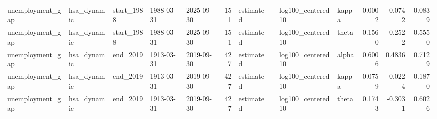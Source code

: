 \begin{tabular}{lllllrllllrrr}
unemployment\_gap & hsa\_dynamic & start\_1988 & 1988-03-31 & 2025-09-30 & 151 & estimated &  & log100\_centered10 & kappa & 0.0002 & -0.0742 & 0.0839 \\
unemployment\_gap & hsa\_dynamic & start\_1988 & 1988-03-31 & 2025-09-30 & 151 & estimated &  & log100\_centered10 & theta & 0.1560 & -0.2522 & 0.5550 \\
unemployment\_gap & hsa\_dynamic & end\_2019 & 1913-03-31 & 2019-09-30 & 427 & estimated &  & log100\_centered10 & alpha & 0.6006 & 0.4836 & 0.7129 \\
unemployment\_gap & hsa\_dynamic & end\_2019 & 1913-03-31 & 2019-09-30 & 427 & estimated &  & log100\_centered10 & kappa & 0.0759 & -0.0224 & 0.1870 \\
unemployment\_gap & hsa\_dynamic & end\_2019 & 1913-03-31 & 2019-09-30 & 427 & estimated &  & log100\_centered10 & theta & 0.1743 & -0.3031 & 0.6026 \\
\bottomrule
\end{tabular}
